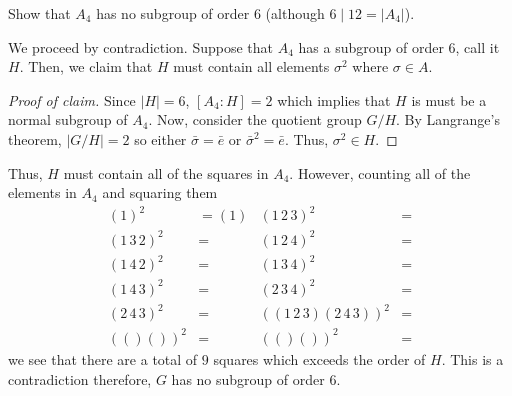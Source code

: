 \begin{problem}
  Show that $A_4$ has no subgroup of order $6$ (although $6\mid 12=|A_4|$).
\end{problem}
\begin{solution}
  We proceed by contradiction. Suppose that $A_4$ has a subgroup of order
  $6$, call it $H$. Then, we claim that $H$ must contain all elements
  $\sigma^2$ where $\sigma\in A$.
  \begin{proof}[Proof of claim]
    \renewcommand\qedsymbol{$\clubsuit$}%
    Since $|H|=6$, $[A_4:H]=2$ which implies that $H$ is must be a normal
    subgroup of $A_4$. Now, consider the quotient group $G/H$. By
    Langrange's theorem, $|G/H|=2$ so either $\bar\sigma=\bar e$ or
    ${\bar\sigma}^2=\bar e$. Thus, $\sigma^2\in H$.
  \end{proof}
  Thus, $H$ must contain all of the squares in $A_4$. However, counting all
  of the elements in $A_4$ and squaring them
  \begin{align*}
    (1)^2&=(1)
    &(1\,2\,3)^2&=
    \\
    (1\,3\,2)^2&=
    &(1\,2\,4)^2&=\\
    (1\,4\,2)^2&=
    &(1\,3\,4)^2&=\\
    (1\,4\,3)^2&=
    &(2\,3\,4)^2&=\\
    (2\,4\,3)^2&=
    &((1\,2\,3)(2\,4\,3))^2
             &=\\
    (()())^2&=&
    (()())^2&=
  \end{align*}
  we see that there are a total of $9$ squares which exceeds the order of
  $H$. This is a contradiction therefore, $G$ has no subgroup of order $6$.
\end{solution}

